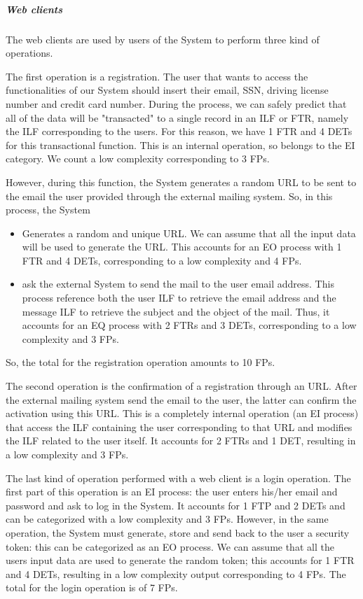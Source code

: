 \subparagraph{Web clients}
The web clients are used by users of the System to perform three kind of operations.

The first operation is a registration. The user that wants to access the functionalities of our System should insert their email, SSN, driving license number and credit card number. During the process, we can safely predict that all of the data will be "transacted" to a single record in an ILF or FTR, namely the ILF corresponding to the users. For this reason, we have 1 FTR and 4 DETs for this transactional function. This is an internal operation, so belongs to the EI category. We count a low complexity corresponding to 3 FPs.

However, during this function, the System generates a random URL to be sent to the email the user provided through the external mailing system. So, in this process, the System
\begin{itemize}
	\item Generates a random and unique URL. We can assume that all the input data will be used to generate the URL. This accounts for an EO process with 1 FTR and 4 DETs, corresponding to a low complexity and 4 FPs.
	\item ask the external System to send the mail to the user email address. This process reference both the user ILF to retrieve the email address and the message ILF to retrieve the subject and the object of the mail. Thus, it accounts for an EQ process with 2 FTRs and 3 DETs, corresponding to a low complexity and 3 FPs.
\end{itemize}
So, the total for the registration operation amounts to 10 FPs.
\smallskip

The second operation is the confirmation of a registration through an URL. After the external mailing system send the email to the user, the latter can confirm the activation using this URL. This is a completely internal operation (an EI process) that access the ILF containing the user corresponding to that URL and modifies the ILF related to the user itself. It accounts for 2 FTRs and 1 DET, resulting in a low complexity and 3 FPs.
\smallskip

The last kind of operation performed with a web client is a login operation. 
The first part of this operation is an EI process: the user enters his/her email and password and ask to log in the System. It accounts for 1 FTP and 2 DETs and can be categorized with a low complexity and 3 FPs.
However, in the same operation, the System must generate, store and send back to the user a security token: this can be categorized as an EO process. We can assume that all the users input data are used to generate the random token; this accounts for 1 FTR and 4 DETs, resulting in a low complexity output corresponding to 4 FPs.
The total for the login operation is of 7 FPs.

